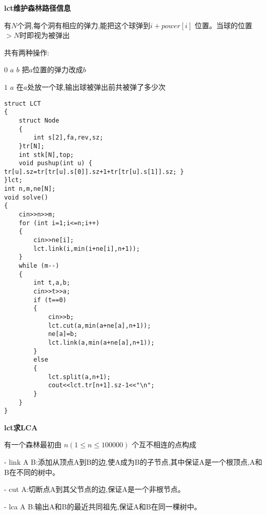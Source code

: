\documentclass[a4paper]{ctexart}
\begin{document}
\textbf{lct维护森林路径信息}

有$N$个洞,每个洞有相应的弹力,能把这个球弹到$i+power[i]$ 位置。当球的位置$>N$时即视为被弹出

共有两种操作:

$0$ $a$ $b$ 把$a$位置的弹力改成$b$

$1$ $a$ 在$a$处放一个球,输出球被弹出前共被弹了多少次

\begin{lstlisting}
struct LCT
{
    struct Node 
    { 
        int s[2],fa,rev,sz;
    }tr[N];
    int stk[N],top;
    void pushup(int u) { tr[u].sz=tr[tr[u].s[0]].sz+1+tr[tr[u].s[1]].sz; }
}lct;
int n,m,ne[N];
void solve()
{
    cin>>n>>m;
    for (int i=1;i<=n;i++)
    {
        cin>>ne[i];
        lct.link(i,min(i+ne[i],n+1));
    }
    while (m--)
    {
        int t,a,b;
        cin>>t>>a;
        if (t==0)
        {
            cin>>b;
            lct.cut(a,min(a+ne[a],n+1));
            ne[a]=b;
            lct.link(a,min(a+ne[a],n+1));
        }
        else
        {
            lct.split(a,n+1);
            cout<<lct.tr[n+1].sz-1<<"\n";
        }
    }
}
\end{lstlisting}

\textbf{lct求LCA}

有一个森林最初由 $n (1 \le n \le 100000)$ 个互不相连的点构成


- link A B:添加从顶点A到B的边,使A成为B的子节点,其中保证A是一个根顶点,A和B在不同的树中。

- cut A:切断点A到其父节点的边,保证A是一个非根节点。

- lca A B:输出A和B的最近共同祖先,保证A和B在同一棵树中。
\end{document}
